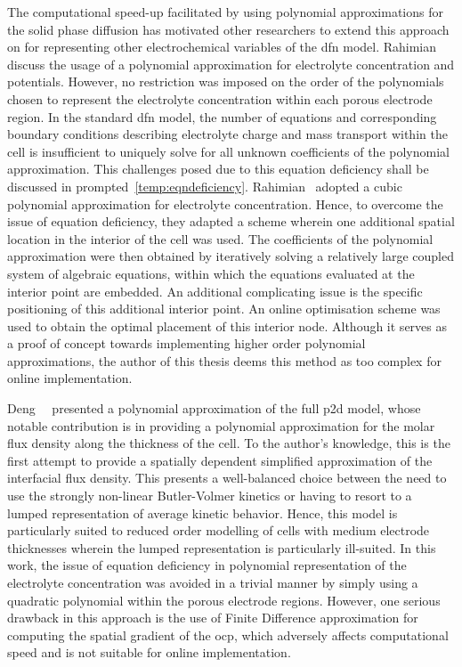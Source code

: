 The computational  speed-up facilitated  by using polynomial  approximations for
the  solid  phase diffusion  has  motivated  other  researchers to  extend  this
approach on  for representing other  electrochemical variables of  the \gls{dfn}
model.  Rahimian~\etal{}~\cite{KhaleghiRahimian2013}  discuss  the  usage  of  a
polynomial approximation for electrolyte  concentration and potentials. However,
no restriction was  imposed on the order of the  polynomials chosen to represent
the  electrolyte  concentration within  each  porous  electrode region.  In  the
standard \gls{dfn}  model, the  number of  equations and  corresponding boundary
conditions describing electrolyte  charge and mass transport within  the cell is
insufficient to  uniquely solve for  all unknown coefficients of  the polynomial
approximation. This  challenges posed due  to this equation deficiency  shall be
discussed  in  prompted~\cref{temp:eqndeficiency}.  Rahimian~\etal{}  adopted  a
cubic polynomial approximation for electrolyte concentration. Hence, to overcome
the issue of  equation deficiency, they adapted a scheme  wherein one additional
spatial location in the  interior of the cell was used.  The coefficients of the
polynomial approximation were then obtained  by iteratively solving a relatively
large  coupled  system  of  algebraic  equations,  within  which  the  equations
evaluated at the  interior point are embedded. An  additional complicating issue
is  the  specific positioning  of  this  additional  interior point.  An  online
optimisation scheme  was used to obtain  the optimal placement of  this interior
node. Although it serves as a proof of concept towards implementing higher order
polynomial approximations,  the author of this  thesis deems this method  as too
complex for online implementation.


Deng~\etal{}~\cite{Deng2018} presented  a polynomial  approximation of  the full
\gls{p2d}  model,  whose  notable  contribution is  in  providing  a  polynomial
approximation for  the molar flux  density along the  thickness of the  cell. To
the  author's knowledge,  this  is  the first  attempt  to  provide a  spatially
dependent  simplified  approximation  of  the  interfacial  flux  density.  This
presents a well-balanced choice between the  need to use the strongly non-linear
Butler-Volmer kinetics or having to resort to a lumped representation of average
kinetic  behavior. Hence,  this model  is particularly  suited to  reduced order
modelling  of  cells  with  medium  electrode  thicknesses  wherein  the  lumped
representation is particularly  ill-suited. In this work, the  issue of equation
deficiency  in polynomial  representation of  the electrolyte  concentration was
avoided in  a trivial manner by  simply using a quadratic  polynomial within the
porous electrode regions. However, one serious  drawback in this approach is the
use of Finite Difference approximation for computing the spatial gradient of the
\gls{ocp}, which adversely  affects computational speed and is  not suitable for
online implementation.


